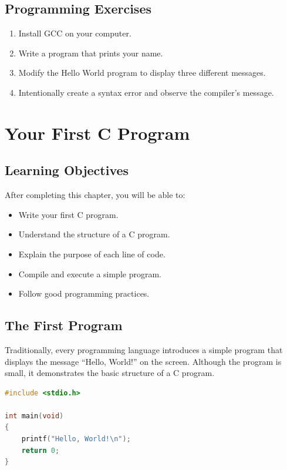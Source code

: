 \documentclass[12pt,openany]{book}
\begin{document}
\section{Programming Exercises}

\begin{enumerate}
    \item Install GCC on your computer.
    \item Write a program that prints your name.
    \item Modify the Hello World program to display three different messages.
    \item Intentionally create a syntax error and observe the compiler's message.
\end{enumerate}
\chapter{Your First C Program}

\section{Learning Objectives}

After completing this chapter, you will be able to:

\begin{itemize}
    \item Write your first C program.
    \item Understand the structure of a C program.
    \item Explain the purpose of each line of code.
    \item Compile and execute a simple program.
    \item Follow good programming practices.
\end{itemize}

\section{The First Program}

Traditionally, every programming language introduces a simple program that displays the message ``Hello, World!'' on the screen. Although the program is small, it demonstrates the basic structure of a C program.

\begin{lstlisting}[language=C]
#include <stdio.h>

int main(void)
{
    printf("Hello, World!\n");
    return 0;
}
\end{lstlisting}
\end{document}
